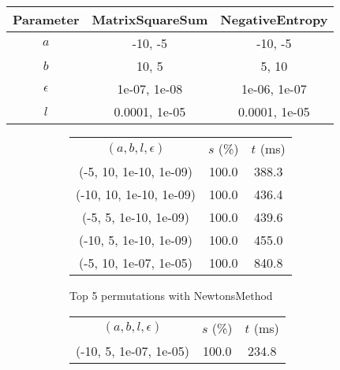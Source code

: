 \begin{center}
\label{tab:params_DichotomousSearch}
\begin{tabular}{|c|c|c|}
\hline
\rowcolor{gray!25}
Parameter & MatrixSquareSum & NegativeEntropy \\
\hline
$a$ & -10, -5 & -10, -5 \\
$b$ & 10, 5 & 5, 10 \\
$\epsilon$ & 1e-07, 1e-08 & 1e-06, 1e-07 \\
$l$ & 0.0001, 1e-05 & 0.0001, 1e-05 \\
\hline
\end{tabular}
\end{center}

\begin{figure}[H]
\label{fig:param_comp_MatrixSquareSum_DichotomousSearch}
\begin{subfigure}[ht]{.5\textwidth}
\begin{tabular}{|c|c|c|}
\hline
\rowcolor{gray!25}
\multicolumn{3}{|c|}{NewtonsMethod} \\
\hline
\rowcolor{gray!25}
$(a,b,l,\epsilon)$ & $s$ (\%) & $t$ (ms) \\
\hline
(-5, 10, 1e-10, 1e-09) & 100.0 & 388.3 \\
(-10, 10, 1e-10, 1e-09) & 100.0 & 436.4 \\
(-5, 5, 1e-10, 1e-09) & 100.0 & 439.6 \\
(-10, 5, 1e-10, 1e-09) & 100.0 & 455.0 \\
(-5, 10, 1e-07, 1e-05) & 100.0 & 840.8 \\
\hline
\end{tabular}
\caption{Top 5 permutations with NewtonsMethod}
\label{subfig:param_comp_MatrixSquareSum_NewtonsMethod_DichotomousSearch}
\end{subfigure}
\hfill
\begin{subfigure}[ht]{.5\textwidth}
\begin{tabular}{|c|c|c|}
\hline
\rowcolor{gray!25}
\multicolumn{3}{|c|}{GradientDescentMethod} \\
\hline
\rowcolor{gray!25}
$(a,b,l,\epsilon)$ & $s$ (\%) & $t$ (ms) \\
\hline
(-10, 5, 1e-07, 1e-05) & 100.0 & 234.8 \\

\end{tabular}
\end{subfigure}
\end{figure}
